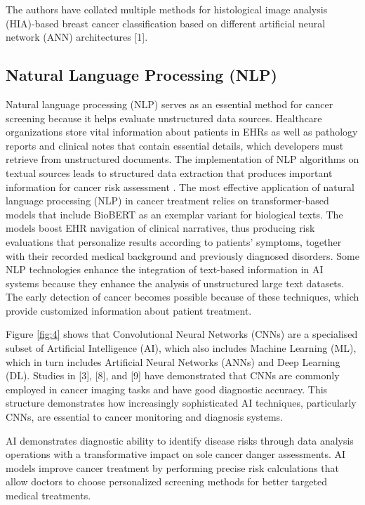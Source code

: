 \documentclass[conference]{IEEEtran}
\begin{document}
The authors have collated multiple methods for histological image analysis (HIA)-based breast cancer classification based on different artificial neural network (ANN) architectures [1].

 \subsection{Natural Language Processing (NLP)}

Natural language processing (NLP) serves as an essential method for cancer screening because it helps evaluate unstructured data sources. Healthcare organizations store vital information about patients in EHRs as well as pathology reports and clinical notes that contain essential details, which developers must retrieve from unstructured documents. The implementation of NLP algorithms on textual sources leads to structured data extraction that produces important information for cancer risk assessment \cite{38}. The most effective application of natural language processing (NLP) in cancer treatment relies on transformer-based models that include BioBERT as an exemplar variant for biological texts. The models boost EHR navigation of clinical narratives, thus producing risk evaluations that personalize results according to patients' symptoms, together with their recorded medical background and previously diagnosed disorders. Some NLP technologies enhance the integration of text-based information in AI systems because they enhance the analysis of unstructured large text datasets. The early detection of cancer becomes possible because of these techniques, which provide customized information about patient treatment.

Figure \ref{fig:4} shows that Convolutional Neural Networks (CNNs) are a specialised subset of Artificial Intelligence (AI), which also includes Machine Learning (ML), which in turn includes Artificial Neural Networks (ANNs) and Deep Learning (DL). Studies in [3], [8], and [9] have demonstrated that CNNs are commonly employed in cancer imaging tasks and have good diagnostic accuracy. This structure demonstrates how increasingly sophisticated AI techniques, particularly CNNs, are essential to cancer monitoring and diagnosis systems.






AI demonstrates diagnostic ability to identify disease risks through data analysis operations with a transformative impact on sole cancer danger assessments. AI models improve cancer treatment by performing precise risk calculations that allow doctors to choose personalized screening methods for better targeted medical treatments.
\end{document}
